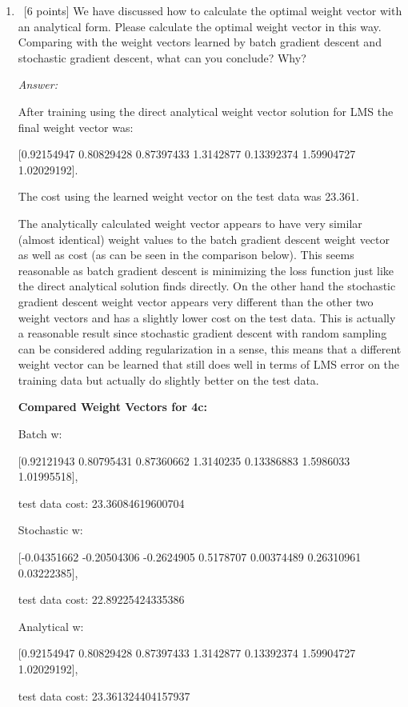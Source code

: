 \documentclass[12pt, fullpage,letterpaper]{article}
\begin{document}
\begin{enumerate}
\begin{enumerate}
		A plot of the cost versus stochastic gradient steps can be seen in \ref{fig:4b1}.

		\begin{figure}[h]
		\begin{center}
		\texttt{[image: 4b\_fig1.png]}
		\end{center}
		\caption{LMS Cost with Each Stochastic Gradient Update for 4b.}
		\label{fig:4b1}
		\end{figure}



		\item~[6 points] We have discussed how to  calculate the optimal weight vector with an analytical form. Please calculate the optimal weight vector in this way. Comparing with the  weight vectors learned by batch gradient descent and stochastic gradient descent, what can you conclude? Why?

		\textit{Answer:}

		After training using the direct analytical weight vector solution for LMS the final weight vector was:

		[0.92154947 0.80829428 0.87397433 1.3142877 0.13392374 1.59904727 1.02029192].

		The cost using the learned weight vector on the test data was 23.361.

		The analytically calculated weight vector appears to have very similar (almost identical) weight values to the batch gradient descent weight vector as well as cost (as can be seen in the comparison below). 
		This seems reasonable as batch gradient descent is minimizing the loss function just like the direct analytical solution finds directly.
		On the other hand the stochastic gradient descent weight vector appears very different than the other two weight vectors and has a slightly lower cost on the test data.
		This is actually a reasonable result since stochastic gradient descent with random sampling can be considered adding regularization in a sense, this means that a different weight vector can be learned that still does well in terms of LMS error on the training data but actually do slightly better on the test data.


		\pagebreak
		\textbf{Compared Weight Vectors for 4c:}

		Batch w: 
		
		[0.92121943 0.80795431 0.87360662 1.3140235  0.13386883 1.5986033 1.01995518], 
		
		test data cost: 23.36084619600704

		Stochastic w: 
		
		[-0.04351662 -0.20504306 -0.2624905   0.5178707   0.00374489  0.26310961 0.03222385], 

		test data cost: 22.89225424335386

		Analytical w: 
		
		[0.92154947 0.80829428 0.87397433 1.3142877  0.13392374 1.59904727 1.02029192], 
		
		test data cost: 23.361324404157937




	\end{enumerate}

\end{enumerate}
\end{document}
